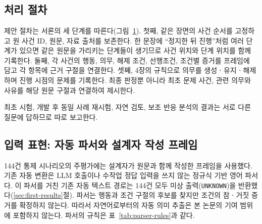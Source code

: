 \section{}
\label{sec:method}

\begin{revision}

\subsection{처리 절차}
\label{sec:workflow}
\begin{figure}[t]
\centering
\color{revisionblue}

\label{fig:method-pipeline}
\end{figure}

제안 절차는 서론의 세 단계를 따른다(그림~\ref{fig:method-pipeline}). 첫째, 같은 장면의 사건 순서를 고정하고 원 사건 ID, 원문, 자료 출처를 보존한다. 한 문장에 ``정지한 뒤 진행''처럼 여러 단계가 있으면 같은 원문을 가리키는 단계들이 생기므로 사건 위치와 단계 위치를 함께 기록한다. 둘째, 각 사건의 행동, 의무, 해제 조건, 선행조건, 조건별 증거를 프레임에 담고 각 항목에 근거 구절을 연결한다. 셋째, 4장의 규칙으로 의무를 생성ㆍ유지ㆍ해제하며 진행 시점의 문제를 기록한다. 최종 판정뿐 아니라 최초 문제 사건, 관련 의무와 사유를 해당 원문 구절과 연결하여 제시한다.

최초 시험, 개발 후 동일 사례 재시험, 자연 검토, 보조 반응 분석의 결과는 서로 다른 질문에 답하므로 따로 보고한다.

\subsection{입력 표현: 자동 파서와 설계자 작성 프레임}
\label{sec:extraction}
144건 통제 시나리오의 주평가에는 설계자가 원문과 함께 작성한 프레임을 사용했다. 기존 자동 변환은 LLM 호출이나 수작업 정답 입력을 쓰지 않는 정규식 기반 영어 파서다. 이 파서를 거친 기존 자동 텍스트 경로는 144건 모두 미상 출력(\texttt{UNKNOWN})을 반환했다(\ref{sec:first-results}절). 파서는 행동과 조건 구절의 후보를 찾지만 조건의 참ㆍ거짓 증거를 확정하지 않는다. 따라서 자연어로부터의 자동 의미 추출은 본 논문의 기여 범위에 포함하지 않는다. 파서의 규칙은 표~\ref{tab:parser-rules}과 같다.


\end{revision}

